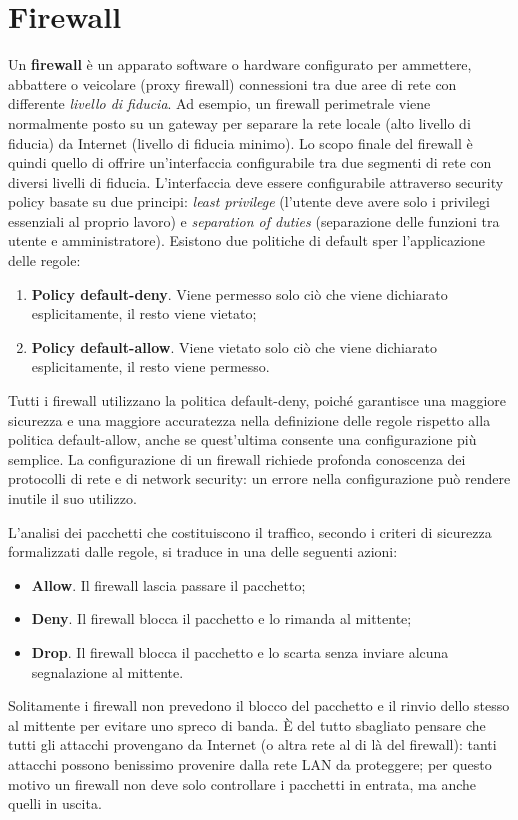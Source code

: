 \chapter{Firewall}
Un \textbf{firewall} è un apparato software o hardware configurato per ammettere, abbattere o veicolare (proxy firewall) connessioni tra due aree di rete con differente \textit{livello di fiducia}. Ad esempio, un firewall perimetrale viene normalmente posto su un gateway per separare la rete locale (alto livello di fiducia) da Internet (livello di fiducia minimo). Lo scopo finale del firewall è quindi quello di offrire un'interfaccia configurabile tra due segmenti di rete con diversi livelli di fiducia. L'interfaccia deve essere configurabile attraverso security policy basate su due principi: \textit{least privilege} (l'utente deve avere solo i privilegi essenziali al proprio lavoro) e \textit{separation of duties} (separazione delle funzioni tra utente e amministratore). Esistono due politiche di default sper l'applicazione delle regole:
\begin{enumerate}
	\item \textbf{Policy default-deny}. Viene permesso solo ciò che viene dichiarato esplicitamente, il resto viene vietato;
	\item \textbf{Policy default-allow}. Viene vietato solo ciò che viene dichiarato esplicitamente, il resto viene permesso.
\end{enumerate}
Tutti i firewall utilizzano la politica default-deny, poiché garantisce una maggiore sicurezza e una maggiore accuratezza nella definizione delle regole rispetto alla politica default-allow, anche se quest'ultima consente una configurazione più semplice. La configurazione di un firewall richiede profonda conoscenza dei protocolli di rete e di network security: un errore nella configurazione può rendere inutile il suo utilizzo.

L'analisi dei pacchetti che costituiscono il traffico, secondo i criteri di sicurezza formalizzati dalle regole, si traduce in una delle seguenti azioni:
\begin{itemize}
	\item \textbf{Allow}. Il firewall lascia passare il pacchetto;
	\item \textbf{Deny}. Il firewall blocca il pacchetto e lo rimanda al mittente;
	\item \textbf{Drop}. Il firewall blocca il pacchetto e lo scarta senza inviare alcuna segnalazione al mittente.
\end{itemize}
Solitamente i firewall non prevedono il blocco del pacchetto e il rinvio dello stesso al mittente per evitare uno spreco di banda. È del tutto sbagliato pensare che tutti gli attacchi provengano da Internet (o altra rete al di là del firewall): tanti attacchi possono benissimo provenire dalla rete LAN da proteggere; per questo motivo un firewall non deve solo controllare i pacchetti in entrata, ma anche quelli in uscita.

